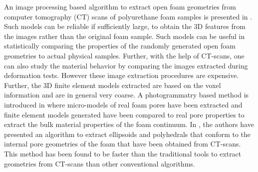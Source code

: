 An image processing based algorithm to extract open foam geometries from computer tomography (CT) scans of polyurethane foam samples is presented in \cite{montminy3DStructureReal2004}. Such models can be reliable if sufficiently large, to obtain the 3D features from the images rather than the original foam sample. Such models can be useful in statistically comparing the properties of the randomly generated open foam geometries to actual physical samples. Further, with the help of CT-scans, one can also study the material behavior by comparing the images extracted during deformation tests\cite{jungInsituExsituMicrotensile2018,jungNanonickelCoatedAluminum2011}. However these image extraction procedures are expensive. Further, the 3D finite element models extracted are based on the voxel information and are in general very coarse. A photogrammatry based method is introduced in \cite{heinzeExperimentalNumericalInvestigation2018} where micro-models of real foam pores have been extracted and finite element models generated have been compared to real pore properties to extract the bulk material properties of the foam continuum. In \cite{leblancAnalysisOpenFoamUnderPreparation}, the authors have presented an algorithm to extract ellipsoids and polyhedrals that conform to the internal pore geometries of the foam that have been obtained from CT-scans. This method has been found to be faster than the traditional tools to extract geometries from CT-scans than other conventional algorithms.
 
